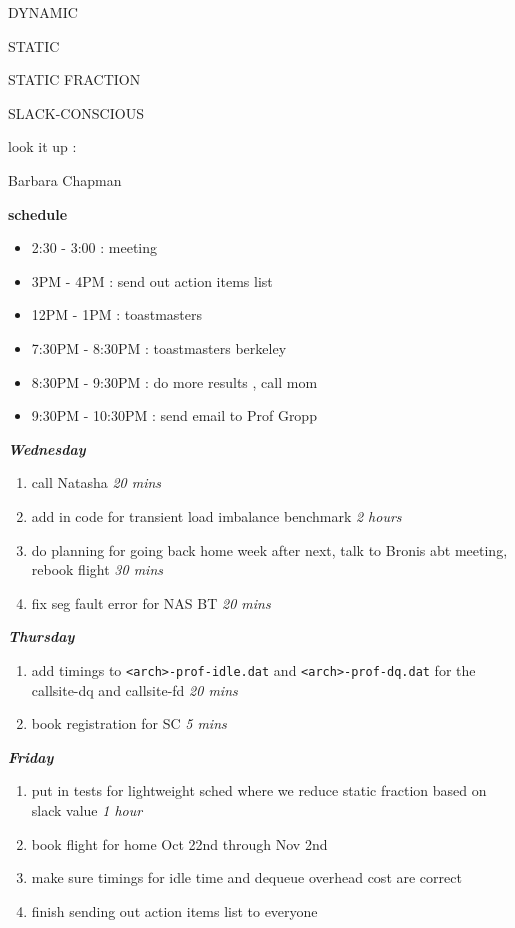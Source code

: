 \documentclass[11pt]{article}
\newcommand{\timeEst}[1]{\textit{#1}}
\begin{document}
DYNAMIC

STATIC

STATIC FRACTION

SLACK-CONSCIOUS

look it up :

Barbara Chapman


\textbf{schedule}
\begin{itemize}
\item 2:30 - 3:00 :  meeting
\item 3PM - 4PM : send out action items list
\item 12PM - 1PM : toastmasters
\item 7:30PM - 8:30PM : toastmasters berkeley
\item 8:30PM - 9:30PM :  do more results , call mom
\item 9:30PM - 10:30PM : send email to Prof Gropp
\end{itemize}


\textbf{\textit{Wednesday}}
\begin{enumerate}
\item call Natasha \timeEst{20 mins}



\item add in code for transient load imbalance benchmark \timeEst{2 hours}
\item do planning for going back home week after next, talk to Bronis abt meeting, rebook flight \timeEst{30 mins}
\item fix seg fault error for NAS BT \timeEst{20 mins}
\end{enumerate}



\textbf{\textit{Thursday}}
\begin{enumerate}
\item add timings to \texttt{<arch>-prof-idle.dat} and \texttt{<arch>-prof-dq.dat} for the callsite-dq and callsite-fd  \timeEst{20 mins}
\item book registration for SC \timeEst{5 mins}
\end{enumerate}

\textbf{\textit{Friday}}
\begin{enumerate}
\item put in tests for lightweight sched where we reduce static fraction based on slack value \timeEst{1 hour}
\item book flight for home Oct 22nd through Nov 2nd
\item make sure timings for idle time and dequeue overhead cost are correct
\item finish sending out action items list to everyone
\end{enumerate}
\end{document}
